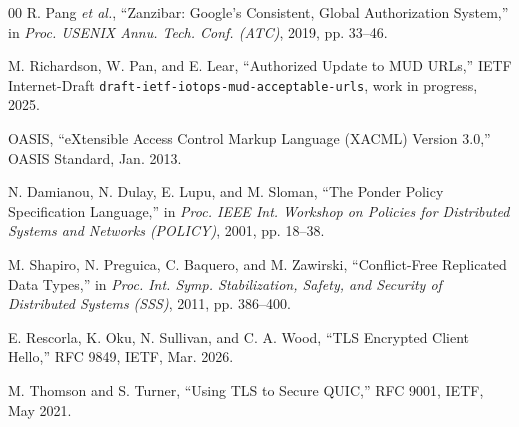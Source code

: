\documentclass[journal]{IEEEtran}
\theoremstyle{definition}
\begin{document}
\begin{thebibliography}{00}
 R. Pang \emph{et al.}, ``Zanzibar: Google's Consistent, Global
Authorization System,'' in \emph{Proc. USENIX Annu. Tech. Conf. (ATC)}, 2019,
pp. 33--46.

 M. Richardson, W. Pan, and E. Lear, ``Authorized
Update to MUD URLs,'' IETF Internet-Draft
\texttt{draft-ietf-iotops-mud-acceptable-urls}, work in progress, 2025.

 OASIS, ``eXtensible Access Control Markup Language (XACML)
Version 3.0,'' OASIS Standard, Jan. 2013.

 N. Damianou, N. Dulay, E. Lupu, and M. Sloman, ``The Ponder
Policy Specification Language,'' in \emph{Proc. IEEE Int. Workshop on Policies
for Distributed Systems and Networks (POLICY)}, 2001, pp. 18--38.

 M. Shapiro, N. Preguica, C. Baquero, and M. Zawirski,
``Conflict-Free Replicated Data Types,'' in \emph{Proc. Int. Symp. Stabilization,
Safety, and Security of Distributed Systems (SSS)}, 2011, pp. 386--400.

 E. Rescorla, K. Oku, N. Sullivan, and C. A. Wood,
``TLS Encrypted Client Hello,'' RFC 9849, IETF, Mar. 2026.

 M. Thomson and S. Turner, ``Using TLS to Secure QUIC,''
RFC 9001, IETF, May 2021.

\end{thebibliography}
\end{document}
